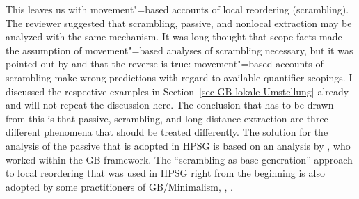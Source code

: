 This leaves us with movement"=based accounts of local reordering (scrambling). The reviewer
suggested that scrambling, passive, and nonlocal extraction may be analyzed with the same
mechanism. It was long thought that scope facts made the assumption of movement"=based analyses of
scrambling necessary, but it was pointed out by  and
 that the reverse is true: movement"=based accounts of scrambling
make wrong predictions with regard to available quantifier scopings. I discussed the respective
examples in Section~\ref{sec-GB-lokale-Umstellung} already and will not repeat the discussion
here. The conclusion that has to be drawn from this is that passive, scrambling, and long distance
extraction are three different phenomena that should be treated differently. The solution for the
analysis of the passive that is adopted in HPSG is based on an analysis by \citet{Haider86}, who
worked within the GB framework. The ``scrambling-as-base generation'' approach to local reordering
that was used in HPSG right from the beginning \citep{Gunji86a} is also adopted by some practitioners
of GB/Minimalism, \eg, \citet{Fanselow2001a}.

